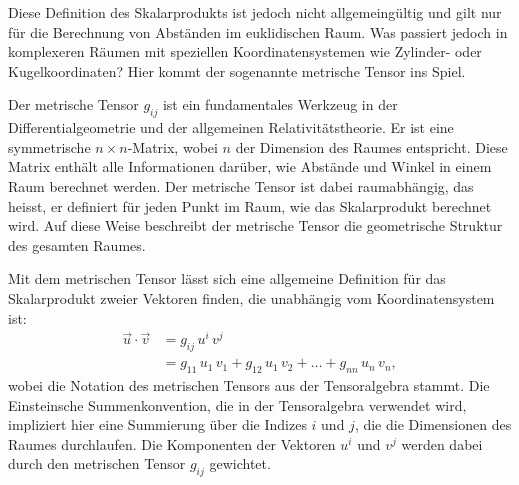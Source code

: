 Diese Definition des Skalarprodukts ist jedoch nicht allgemeingültig und gilt nur für die Berechnung von Abständen im euklidischen Raum.
Was passiert jedoch in komplexeren Räumen mit speziellen Koordinatensystemen wie Zylinder- oder Kugelkoordinaten? 
Hier kommt der sogenannte metrische Tensor ins Spiel.

%

Der metrische Tensor $g_{ij}$ ist ein fundamentales Werkzeug in der Differentialgeometrie und der allgemeinen Relativitätstheorie. 
Er ist eine symmetrische $n \times n$-Matrix, wobei $n$ der Dimension des Raumes entspricht. 
Diese Matrix enthält alle Informationen darüber, wie Abstände und Winkel in einem Raum berechnet werden.
Der metrische Tensor ist dabei raumabhängig, das heisst, er definiert für jeden Punkt im Raum, wie das Skalarprodukt berechnet wird.
Auf diese Weise beschreibt der metrische Tensor die geometrische Struktur des gesamten Raumes.

Mit dem metrischen Tensor lässt sich eine allgemeine Definition für das Skalarprodukt zweier Vektoren finden, die unabhängig vom Koordinatensystem ist:
\begin{equation}
	\begin{align}
		\vec{u} \cdot \vec{v} &= g_{ij} \, u^i \, v^j \\
		&= g_{11} \, u_1 \, v_1 + g_{12} \, u_1 \, v_2 + \dots + g_{nn} \, u_n \, v_n,
	\end{align}
\end{equation}
wobei die Notation des metrischen Tensors aus der Tensoralgebra stammt.
Die Einsteinsche Summenkonvention, die in der Tensoralgebra verwendet wird, impliziert hier eine Summierung über die Indizes $i$ und $j$, die die Dimensionen des Raumes durchlaufen.
Die Komponenten der Vektoren $u^i$ und $v^j$ werden dabei durch den metrischen Tensor $g_{ij}$ gewichtet.

